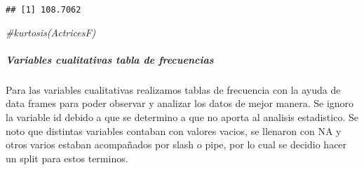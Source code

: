 \documentclass[
]{article}
\newenvironment{Shaded}{\begin{snugshade}}{\end{snugshade}}
\newcommand{\CommentTok}[1]{\textcolor[rgb]{0.56,0.35,0.01}{\textit{#1}}}
\begin{document}
\begin{verbatim}
## [1] 108.7062
\end{verbatim}

\begin{Shaded}
\begin{Highlighting}[]
\CommentTok{\#kurtosis(ActricesF)}
\end{Highlighting}
\end{Shaded}

\hypertarget{variables-cualitativas-tabla-de-frecuencias}{%
\subparagraph{Variables cualitativas tabla de
frecuencias}\label{variables-cualitativas-tabla-de-frecuencias}}

Para las variables cualitativas realizamos tablas de frecuencia con la
ayuda de data frames para poder observar y analizar los datos de mejor
manera. Se ignoro la variable id debido a que se determino a que no
aporta al analisis estadistico. Se noto que distintas variables contaban
con valores vacios, se llenaron con NA y otros varios estaban
acompañados por slash o pipe, por lo cual se decidio hacer un split para
estos terminos.
\end{document}
